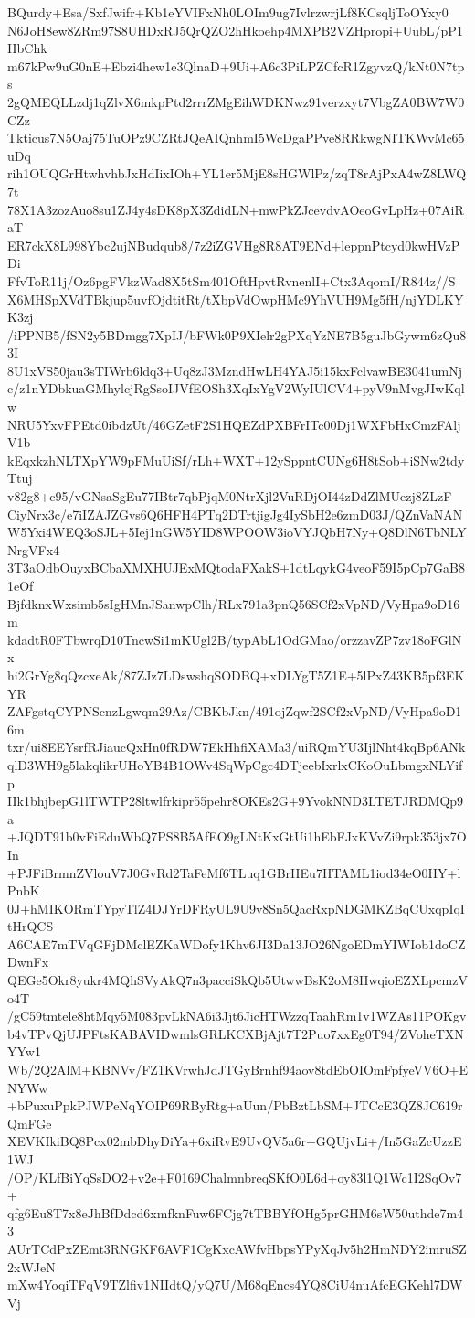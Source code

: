 BQurdy+Esa/SxfJwifr+Kb1eYVIFxNh0LOIm9ug7IvlrzwrjLf8KCsqljToOYxy0
N6JoH8ew8ZRm97S8UHDxRJ5QrQZO2hHkoehp4MXPB2VZHpropi+UubL/pP1HbChk
m67kPw9uG0nE+Ebzi4hew1e3QlnaD+9Ui+A6c3PiLPZCfcR1ZgyvzQ/kNt0N7tps
2gQMEQLLzdj1qZlvX6mkpPtd2rrrZMgEihWDKNwz91verzxyt7VbgZA0BW7W0CZz
Tkticus7N5Oaj75TuOPz9CZRtJQeAIQnhmI5WcDgaPPve8RRkwgNITKWvMc65uDq
rih1OUQGrHtwhvhbJxHdIixIOh+YL1er5MjE8sHGWlPz/zqT8rAjPxA4wZ8LWQ7t
78X1A3zozAuo8su1ZJ4y4sDK8pX3ZdidLN+mwPkZJcevdvAOeoGvLpHz+07AiRaT
ER7ckX8L998Ybc2ujNBudqub8/7z2iZGVHg8R8AT9ENd+leppnPtcyd0kwHVzPDi
FfvToR11j/Oz6pgFVkzWad8X5tSm401OftHpvtRvnenlI+Ctx3AqomI/R844z//S
X6MHSpXVdTBkjup5uvfOjdtitRt/tXbpVdOwpHMc9YhVUH9Mg5fH/njYDLKYK3zj
/iPPNB5/fSN2y5BDmgg7XpIJ/bFWk0P9XIelr2gPXqYzNE7B5guJbGywm6zQu83I
8U1xVS50jau3sTIWrb6ldq3+Uq8zJ3MzndHwLH4YAJ5i15kxFclvawBE3041umNj
c/z1nYDbkuaGMhylcjRgSsoIJVfEOSh3XqIxYgV2WyIUlCV4+pyV9nMvgJIwKqlw
NRU5YxvFPEtd0ibdzUt/46GZetF2S1HQEZdPXBFrITc00Dj1WXFbHxCmzFAljV1b
kEqxkzhNLTXpYW9pFMuUiSf/rLh+WXT+12ySppntCUNg6H8tSob+iSNw2tdyTtuj
v82g8+c95/vGNsaSgEu77IBtr7qbPjqM0NtrXjl2VuRDjOI44zDdZlMUezj8ZLzF
CiyNrx3c/e7iIZAJZGvs6Q6HFH4PTq2DTrtjigJg4IySbH2e6zmD03J/QZnVaNAN
W5Yxi4WEQ3oSJL+5Iej1nGW5YID8WPOOW3ioVYJQbH7Ny+Q8DlN6TbNLYNrgVFx4
3T3aOdbOuyxBCbaXMXHUJExMQtodaFXakS+1dtLqykG4veoF59I5pCp7GaB81eOf
BjfdknxWxsimb5sIgHMnJSanwpClh/RLx791a3pnQ56SCf2xVpND/VyHpa9oD16m
kdadtR0FTbwrqD10TncwSi1mKUgl2B/typAbL1OdGMao/orzzavZP7zv18oFGlNx
hi2GrYg8qQzcxeAk/87ZJz7LDswshqSODBQ+xDLYgT5Z1E+5lPxZ43KB5pf3EKYR
ZAFgstqCYPNScnzLgwqm29Az/CBKbJkn/491ojZqwf2SCf2xVpND/VyHpa9oD16m
txr/ui8EEYsrfRJiaucQxHn0fRDW7EkHhfiXAMa3/uiRQmYU3IjlNht4kqBp6ANk
qlD3WH9g5lakqlikrUHoYB4B1OWv4SqWpCgc4DTjeebIxrlxCKoOuLbmgxNLYifp
IIk1bhjbepG1lTWTP28ltwlfrkipr55pehr8OKEs2G+9YvokNND3LTETJRDMQp9a
+JQDT91b0vFiEduWbQ7PS8B5AfEO9gLNtKxGtUi1hEbFJxKVvZi9rpk353jx7OIn
+PJFiBrmnZVlouV7J0GvRd2TaFeMf6TLuq1GBrHEu7HTAML1iod34eO0HY+lPnbK
0J+hMIKORmTYpyTlZ4DJYrDFRyUL9U9v8Sn5QacRxpNDGMKZBqCUxqpIqItHrQCS
A6CAE7mTVqGFjDMclEZKaWDofy1Khv6JI3Da13JO26NgoEDmYIWIob1doCZDwnFx
QEGe5Okr8yukr4MQhSVyAkQ7n3pacciSkQb5UtwwBsK2oM8HwqioEZXLpcmzVo4T
/gC59tmtele8htMqy5M083pvLkNA6i3Jjt6JicHTWzzqTaahRm1v1WZAs11POKgv
b4vTPvQjUJPFtsKABAVIDwmlsGRLKCXBjAjt7T2Puo7xxEg0T94/ZVoheTXNYYw1
Wb/2Q2AlM+KBNVv/FZ1KVrwhJdJTGyBrnhf94aov8tdEbOIOmFpfyeVV6O+ENYWw
+bPuxuPpkPJWPeNqYOIP69RByRtg+aUun/PbBztLbSM+JTCcE3QZ8JC619rQmFGe
XEVKIkiBQ8Pcx02mbDhyDiYa+6xiRvE9UvQV5a6r+GQUjvLi+/In5GaZcUzzE1WJ
/OP/KLfBiYqSsDO2+v2e+F0169ChalmnbreqSKfO0L6d+oy83l1Q1Wc1I2SqOv7+
qfg6Eu8T7x8eJhBfDdcd6xmfknFuw6FCjg7tTBBYfOHg5prGHM6sW50uthde7m43
AUrTCdPxZEmt3RNGKF6AVF1CgKxcAWfvHbpsYPyXqJv5h2HmNDY2imruSZ2xWJeN
mXw4YoqiTFqV9TZlfiv1NIIdtQ/yQ7U/M68qEncs4YQ8CiU4nuAfcEGKehl7DWVj

